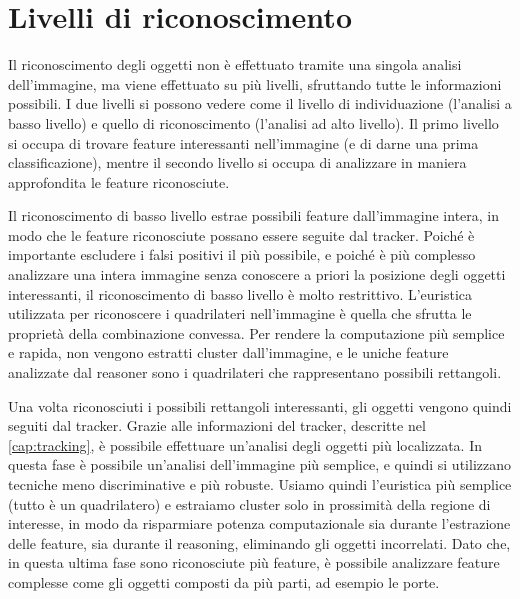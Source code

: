 \section{Livelli di riconoscimento}
Il riconoscimento degli oggetti non è effettuato tramite una singola analisi dell'immagine, ma viene effettuato su più livelli, sfruttando tutte le informazioni possibili.
I due livelli si possono vedere come il livello di individuazione (l'analisi a basso livello) e quello di riconoscimento (l'analisi ad alto livello). Il primo livello si occupa di trovare feature interessanti nell'immagine (e di darne una prima classificazione), mentre il secondo livello si occupa di analizzare in maniera approfondita le feature riconosciute.

Il riconoscimento di basso livello estrae possibili feature dall'immagine intera, in modo che le feature riconosciute possano essere seguite dal tracker. Poiché è importante escludere i falsi positivi il più possibile, e poiché è più complesso analizzare una intera immagine senza conoscere a priori la posizione degli oggetti interessanti, il riconoscimento di basso livello è molto restrittivo. L'euristica utilizzata per riconoscere i quadrilateri nell'immagine è quella che sfrutta le proprietà della combinazione convessa.
Per rendere la computazione più semplice e rapida, non vengono estratti cluster dall'immagine, e le uniche feature analizzate dal reasoner sono i quadrilateri che rappresentano possibili rettangoli.

Una volta riconosciuti i possibili rettangoli interessanti, gli oggetti vengono quindi seguiti dal tracker. Grazie alle informazioni del tracker, descritte nel \autoref{cap:tracking}, è possibile effettuare un'analisi degli oggetti più localizzata. In questa fase è possibile un'analisi dell'immagine più semplice, e quindi si utilizzano tecniche meno discriminative e più robuste. Usiamo quindi l'euristica più semplice (tutto è un quadrilatero) e estraiamo cluster solo in prossimità della regione di interesse, in modo da risparmiare potenza computazionale sia durante l'estrazione delle feature, sia durante il reasoning, eliminando gli oggetti incorrelati. Dato che, in questa ultima fase sono riconosciute più feature, è possibile analizzare feature complesse come gli oggetti composti da più parti, ad esempio le porte.
